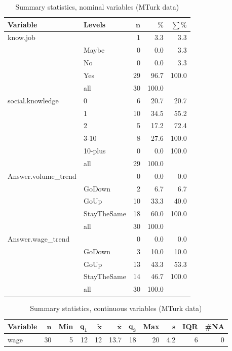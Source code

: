 \documentclass[a4paper,10pt]{article}\usepackage[]{graphicx}\usepackage[]{color}
\begin{document}
\begin{table}[ht]
\centering
{\footnotesize
\begin{tabular}{ll|rrr}
 \textbf{Variable} & \textbf{Levels} & $\mathbf{n}$ & $\mathbf{\%}$ & $\mathbf{\sum \%}$ \\ 
  \hline
know.job &  & 1 & 3.3 & 3.3 \\ 
   & Maybe & 0 & 0.0 & 3.3 \\ 
   & No & 0 & 0.0 & 3.3 \\ 
   & Yes & 29 & 96.7 & 100.0 \\ 
   \hline
 & all & 30 & 100.0 &  \\ 
   \hline
\hline
social.knowledge & 0 & 6 & 20.7 & 20.7 \\ 
   & 1 & 10 & 34.5 & 55.2 \\ 
   & 2 & 5 & 17.2 & 72.4 \\ 
   & 3-10 & 8 & 27.6 & 100.0 \\ 
   & 10-plus & 0 & 0.0 & 100.0 \\ 
   \hline
 & all & 29 & 100.0 &  \\ 
   \hline
\hline
Answer.volume\_trend &  & 0 & 0.0 & 0.0 \\ 
   & GoDown & 2 & 6.7 & 6.7 \\ 
   & GoUp & 10 & 33.3 & 40.0 \\ 
   & StayTheSame & 18 & 60.0 & 100.0 \\ 
   \hline
 & all & 30 & 100.0 &  \\ 
   \hline
\hline
Answer.wage\_trend &  & 0 & 0.0 & 0.0 \\ 
   & GoDown & 3 & 10.0 & 10.0 \\ 
   & GoUp & 13 & 43.3 & 53.3 \\ 
   & StayTheSame & 14 & 46.7 & 100.0 \\ 
   \hline
 & all & 30 & 100.0 &  \\ 
   \hline
\hline
\end{tabular}
}
\caption{Summary statistics, nominal variables (MTurk data)} 
\label{tab1:39-5010}
\end{table}
\begin{table}[ht]
\centering
{\footnotesize
\begin{tabular}{lrrrrrrrrrr}
 \textbf{Variable} & $\mathbf{n}$ & \textbf{Min} & $\mathbf{q_1}$ & $\mathbf{\widetilde{x}}$ & $\mathbf{\bar{x}}$ & $\mathbf{q_3}$ & \textbf{Max} & $\mathbf{s}$ & \textbf{IQR} & \textbf{\#NA} \\ 
  \hline
wage & 30 & 5 & 12 & 12 & 13.7 & 18 & 20 & 4.2 & 6 & 0 \\ 
  \end{tabular}
}
\caption{Summary statistics, continuous variables (MTurk data)} 
\label{tab2:39-5010}
\end{table}
\end{document}
